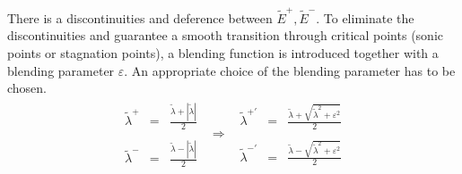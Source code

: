 \documentclass[11pt, a4paper]{article}
\begin{document}
There is a discontinuities and deference between $\tilde{E}^+,\tilde{E}^-$.
To eliminate the discontinuities and guarantee a smooth transition through critical points (sonic points or stagnation points), a blending function is introduced together with a blending parameter $\varepsilon$. An appropriate choice of the blending parameter has to be chosen.
\begin{equation}
    \begin{matrix}
        \begin{array}{lcl}
            \tilde{\lambda}^+ & = & \displaystyle\frac{\tilde{\lambda}+\left|\tilde{\lambda}\right|}{2} \\\\
            \tilde{\lambda}^- & = & \displaystyle\frac{\tilde{\lambda}-\left|\tilde{\lambda}\right|}{2}
        \end{array} & \Rightarrow & \begin{array}{lcl}
            \tilde{\lambda}^{+'} & = & \displaystyle\frac{\tilde{\lambda}+\sqrt{\tilde{\lambda}^2+\varepsilon^2}}{2} \\\\
            \tilde{\lambda}^{-'} & = & \displaystyle\frac{\tilde{\lambda}-\sqrt{\tilde{\lambda}^2+\varepsilon^2}}{2}
        \end{array}
    \end{matrix}
\end{equation}
\end{document}
